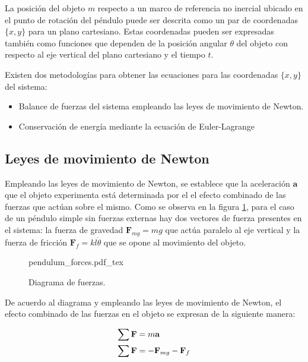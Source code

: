 
La posición del objeto $m$ respecto a un marco de referencia no inercial
ubicado en el punto de rotación del péndulo puede ser descrita como un par
de coordenadas $\{x, y\}$ para un plano cartesiano. Estas coordenadas pueden
ser expresadas también como funciones que dependen de la posición angular 
$\theta$ del objeto con respecto al eje vertical del plano cartesiano y el
tiempo $t$.

Existen dos metodologías para obtener las ecuaciones para las coordenadas 
$\{x, y\}$ del sistema:
\begin{itemize}
 \item Balance de fuerzas del sistema empleando las leyes de 
 movimiento de Newton.
 \item Conservación de energía mediante la ecuación de Euler-Lagrange
\end{itemize}




\subsection{Leyes de movimiento de Newton}

Empleando las leyes de movimiento de Newton, 
se establece que la aceleración $\textbf{a}$ que el objeto
experimenta está determinada por el el
efecto combinado de las fuerzas que actúan sobre el mismo.
Como se observa en la figura \ref{fig: pendulum forces}, 
para el caso de un péndulo simple sin fuerzas externas 
hay dos vectores de fuerza presentes en el sistema:
la fuerza de gravedad $\textbf{F}_{mg} = mg$ que actúa paralelo al eje vertical 
y la fuerza de fricción $\textbf{F}_f = kl\dot{\theta}$ que se opone al movimiento del objeto. 

 \begin{figure}[ht]
    \centering
    {pendulum_forces.pdf_tex}
    \caption{Diagrama de fuerzas.}
    \label{fig: pendulum forces}
\end{figure}

De acuerdo al diagrama y empleando las leyes de movimiento de Newton, 
el efecto combinado de las fuerzas en el objeto se expresan de la 
siguiente manera:


\begin{equation}
 \begin{split}
  \sum \textbf{F} & = m \textbf{a}\\
  \sum \bold{F} & = - \bold{F}_{mg} - \bold{F}_f
 \end{split}
 \label{eq: }
\end{equation}

